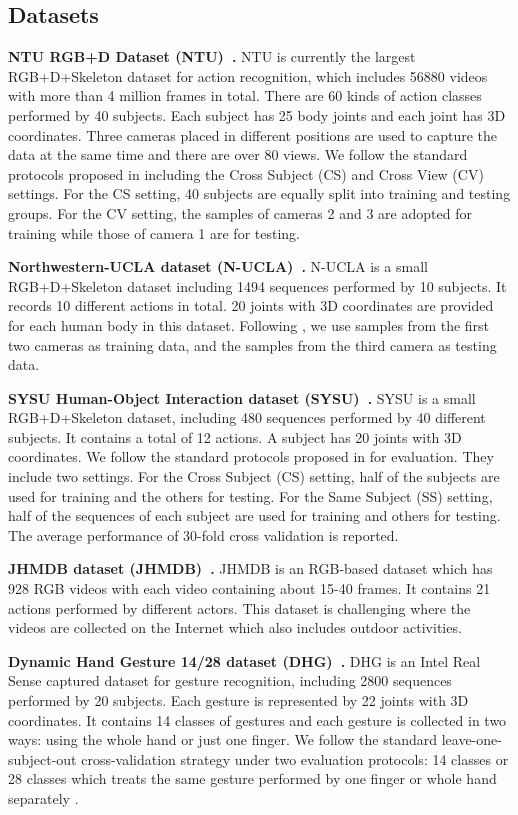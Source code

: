 \documentclass[journal]{IEEEtran}
\begin{document}
\subsection{Datasets}
\label{datasets}
\textbf{NTU RGB+D Dataset (NTU)~\cite{Shahroudy_2016_CVPR}.} NTU is currently the largest RGB+D+Skeleton dataset for action recognition, which includes 56880 videos with more than 4 million frames in total. There are 60 kinds of action classes performed by 40 subjects. Each subject has 25 body joints and each joint has 3D coordinates. Three cameras placed in different positions are used to capture the data at the same time and there are over 80 views. We follow the standard protocols proposed in \cite{Shahroudy_2016_CVPR} including the Cross Subject (CS) and Cross View (CV) settings. For the CS setting, 40 subjects are equally split into training and testing groups. For the CV setting, the samples of cameras 2 and 3 are adopted for training while those of camera 1 are for testing. 

\textbf{Northwestern-UCLA dataset (N-UCLA)~\cite{wang2014cross}.} N-UCLA is a small RGB+D+Skeleton dataset including 1494 sequences performed by 10 subjects. It records 10 different actions in total. 20 joints with 3D coordinates are provided for each human body in this dataset. Following \cite{wang2014cross}, we use samples from the first two cameras as training data, and the samples from the third camera as testing data. 

\textbf{SYSU Human-Object Interaction dataset (SYSU)~\cite{hu2015jointly}.} SYSU is a small RGB+D+Skeleton dataset, including 480 sequences performed by 40 different subjects. It contains a total of 12 actions. A subject has 20 joints with 3D coordinates. We follow the standard protocols proposed in \cite{hu2015jointly} for evaluation. They include two settings. For the Cross Subject (CS) setting, half of the subjects are used for training and the others for testing. For the Same Subject (SS) setting, half of the sequences of each subject are used for training and others for testing. The average performance of 30-fold cross validation is reported.

\textbf{JHMDB dataset (JHMDB)~\cite{jhuang2013towards}.} JHMDB is an RGB-based dataset which has 928 RGB videos with each video containing about 15-40 frames. It contains 21 actions performed by different actors. This dataset is challenging where the videos are collected on the Internet which also includes outdoor activities.

\textbf{Dynamic Hand Gesture 14/28 dataset (DHG)~\cite{de2016skeleton}.} DHG is an Intel Real Sense captured dataset for gesture recognition, including 2800 sequences performed by 20 subjects. Each gesture is represented by 22 joints with 3D coordinates. It contains 14 classes of gestures and each gesture is collected in two ways: using the whole hand or just one finger. We follow the standard leave-one-subject-out cross-validation strategy under two evaluation protocols: 14 classes or 28 classes which treats the same gesture performed by one finger or whole hand separately \cite{de2016skeleton}.
\end{document}
